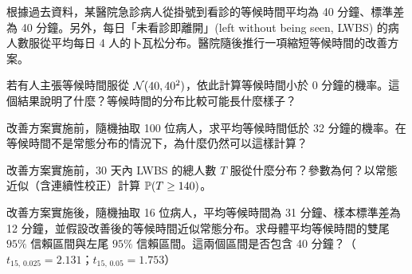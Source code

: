 \begin{scenario}
    根據過去資料，某醫院急診病人從掛號到看診的等候時間平均為 40 分鐘、標準差為 40 分鐘。另外，每日「未看診即離開」(left without being seen, LWBS) 的病人數服從平均每日 4 人的卜瓦松分布。醫院隨後推行一項縮短等候時間的改善方案。
\end{scenario}
\begin{subproblems}
     若有人主張等候時間服從 $\mathcal{N}(40, 40^2)$，依此計算等候時間小於 0 分鐘的機率。這個結果說明了什麼？等候時間的分布比較可能長什麼樣子？ \workspace

     改善方案實施前，隨機抽取 100 位病人，求平均等候時間低於 32 分鐘的機率。在等候時間不是常態分布的情況下，為什麼仍然可以這樣計算？ \workspace

     改善方案實施前，30 天內 LWBS 的總人數 $T$ 服從什麼分布？參數為何？以常態近似（含連續性校正）計算 $\mathbb{P}(T \ge 140)$。 \workspace

     改善方案實施後，隨機抽取 16 位病人，平均等候時間為 31 分鐘、樣本標準差為 12 分鐘，並假設改善後的等候時間近似常態分布。求母體平均等候時間的雙尾 $95\%$ 信賴區間與左尾 $95\%$ 信賴區間。這兩個區間是否包含 40 分鐘？（$t_{15,\,0.025} = 2.131$；$t_{15,\,0.05} = 1.753$） \workspace
\end{subproblems}


